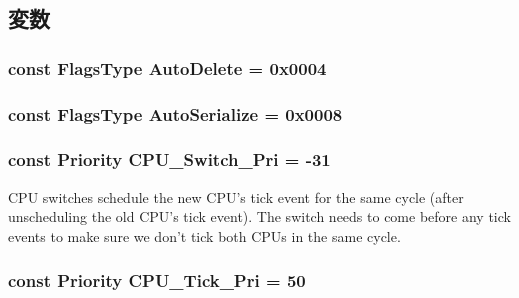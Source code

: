 \subsection{変数}
\hypertarget{classEventBase_a54ba74dbb445f08c349fc85154f58b97}{
\subsubsection[{AutoDelete}]{\setlength{\rightskip}{0pt plus 5cm}const {\bf FlagsType} {\bf AutoDelete} = 0x0004}}
\label{classEventBase_a54ba74dbb445f08c349fc85154f58b97}
\hypertarget{classEventBase_ab0020d618271fa7867d0cf1373b325a9}{
\subsubsection[{AutoSerialize}]{\setlength{\rightskip}{0pt plus 5cm}const {\bf FlagsType} {\bf AutoSerialize} = 0x0008}}
\label{classEventBase_ab0020d618271fa7867d0cf1373b325a9}
\hypertarget{classEventBase_abd37284b13fd2e86cae48001c8d7b691}{
\subsubsection[{CPU\_\-Switch\_\-Pri}]{\setlength{\rightskip}{0pt plus 5cm}const {\bf Priority} {\bf CPU\_\-Switch\_\-Pri} = -\/31}}
\label{classEventBase_abd37284b13fd2e86cae48001c8d7b691}
CPU switches schedule the new CPU's tick event for the same cycle (after unscheduling the old CPU's tick event). The switch needs to come before any tick events to make sure we don't tick both CPUs in the same cycle. \hypertarget{classEventBase_a654adc14d3292be01ccfcfc16cda2e88}{
\subsubsection[{CPU\_\-Tick\_\-Pri}]{\setlength{\rightskip}{0pt plus 5cm}const {\bf Priority} {\bf CPU\_\-Tick\_\-Pri} = 50}}
